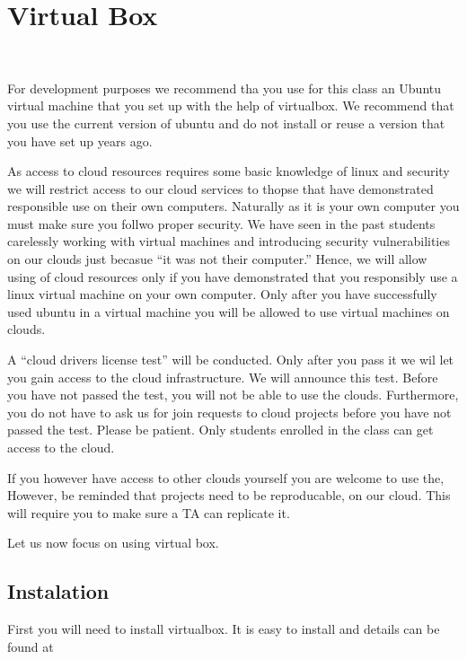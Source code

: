 \chapter{Virtual Box}
\label{S:virtual-box}

\FILENAME\

For development purposes we recommend tha you use for this class an
Ubuntu virtual machine that you set up with the help of virtualbox. We
recommend that you use the current version of ubuntu and do not
install or reuse a version that you have set up years ago.

As access to cloud resources requires some basic knowledge of linux
and security we will restrict access to our cloud services to thopse
that have demonstrated responsible use on their own
computers. Naturally as it is your own computer you must make sure you
follwo proper security. We have seen in the past students carelessly
working with virtual machines and introducing security vulnerabilities
on our clouds just becasue ``it was not their computer.'' Hence, we
will allow using of cloud resources only if you have demonstrated that
you responsibly use a linux virtual machine on your own computer.
Only after you have successfully used ubuntu in a virtual machine you
will be allowed to use virtual machines on clouds.

A ``cloud drivers license test'' will be conducted. Only after you
pass it we wil let you gain access to the cloud infrastructure. We
will announce this test. Before you have not passed the test, you will
not be able to use the clouds.  Furthermore, you do not have to ask us
for join requests to cloud projects before you have not passed the
test. Please be patient. Only students enrolled in the class can get
access to the cloud. 

If you however have access to other clouds yourself you are welcome to
use the, However, be reminded that projects need to be reproducable,
on our cloud. This will require you to make sure a TA can replicate it.

Let us now focus on using virtual box.

\section{Instalation}\label{creation}

First you will need to install virtualbox. It is easy to install and
details can be found at


